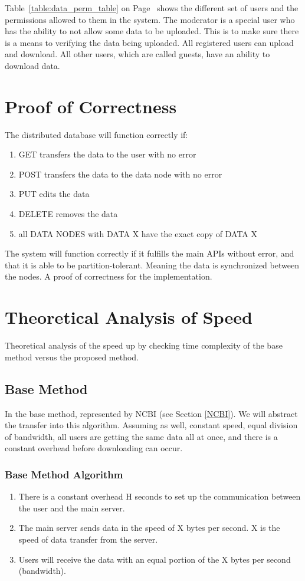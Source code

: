 \documentclass[acmsmall]{acmart}
\begin{document}
Table~\ref{table:data_perm_table} on Page~\pageref{table:data_perm_table} shows the different set of users and the permissions allowed to them in the system. The moderator is a special user who has the ability to not allow some data to be uploaded. This is to make sure there is a means to verifying the data being uploaded. All registered users can upload and download. All other users, which are called guests, have an ability to download data.


\section{Proof of Correctness}
The distributed database will function correctly if:

\begin{enumerate}
    \item GET transfers the data to the user with no error
    \item POST transfers the data to the data node with no error
    \item PUT edits the data
    \item DELETE removes the data
    \item all DATA NODES with DATA X have the exact copy of DATA X
\end{enumerate}


The system will function correctly if it fulfills the main APIs without error, and that it is able to be partition-tolerant. Meaning the data is synchronized between the nodes. A proof of correctness for the implementation.

\section{Theoretical Analysis of Speed} 

Theoretical analysis of the speed up by checking time complexity of the base method versus the proposed method.

\subsection{Base Method}
In the base method, represented by NCBI (see Section \ref{NCBI}). We will abstract the transfer into this algorithm. Assuming as well, constant speed, equal division of bandwidth, all users are getting the same data all at once, and there is a constant overhead before downloading can occur.

\subsubsection{Base Method Algorithm}
\begin{enumerate}
    \item There is a constant overhead H seconds to set up the communication between the user and the main server.
    \item The main server sends data in the speed of X bytes per second. X is the speed of data transfer from the server.
    \item Users will receive the data with an equal portion of the X bytes per second (bandwidth).
\end{enumerate}
\end{document}
